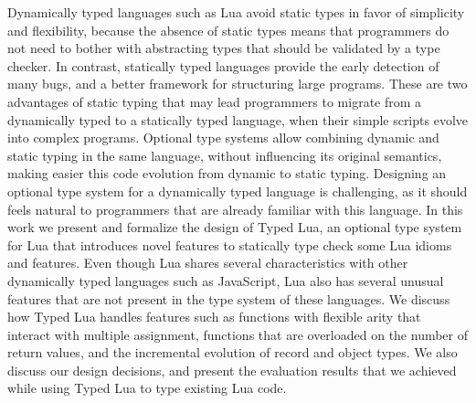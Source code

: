 Dynamically typed languages such as Lua avoid static types in favor of
simplicity and flexibility, because the absence of static types means
that programmers do not need to bother with abstracting types that
should be validated by a type checker.
In contrast, statically typed languages provide the early detection of
many bugs, and a better framework for structuring large programs.
These are two advantages of static typing that may lead programmers
to migrate from a dynamically typed to a statically typed language,
when their simple scripts evolve into complex programs.
Optional type systems allow combining dynamic and static typing in
the same language, without influencing its original semantics,
making easier this code evolution from dynamic to static typing.
Designing an optional type system for a dynamically typed language
is challenging, as it should feels natural to programmers that are
already familiar with this language.
In this work we present and formalize the design of Typed Lua,
an optional type system for Lua that introduces novel features
to statically type check some Lua idioms and features.
Even though Lua shares several characteristics with other dynamically
typed languages such as JavaScript, Lua also has several unusual features
that are not present in the type system of these languages.
We discuss how Typed Lua handles features such as functions with flexible
arity that interact with multiple assignment, functions that are overloaded
on the number of return values, and the incremental evolution of record and object types.
We also discuss our design decisions, and present the evaluation results
that we achieved while using Typed Lua to type existing Lua code.
